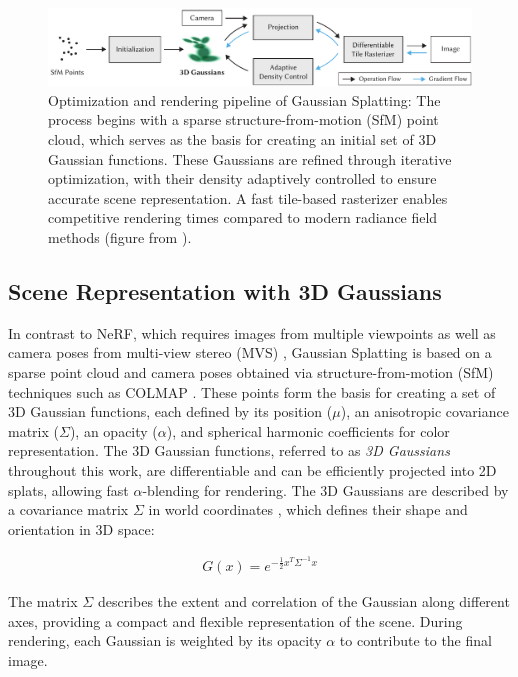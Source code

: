 \begin{figure}
\centering
\includegraphics[width=\linewidth]{Grafiken/Fundamentals/overview_01.pdf}
\caption{Optimization and rendering pipeline of Gaussian Splatting: The process begins with a sparse structure-from-motion (SfM) point cloud, which serves as the basis for creating an initial set of 3D Gaussian functions. These Gaussians are refined through iterative optimization, with their density adaptively controlled to ensure accurate scene representation. A fast tile-based rasterizer enables competitive rendering times compared to modern radiance field methods (figure from \cite{kerbl3Dgaussians}).}
\label{fig:overview}
\end{figure}


\subsection{Scene Representation with 3D Gaussians}

In contrast to NeRF, which requires images from multiple viewpoints as well as camera poses from multi-view stereo (MVS) \cite{schoenberger2016mvs}, Gaussian Splatting is based on a sparse point cloud and camera poses obtained via structure-from-motion (SfM) techniques such as COLMAP \cite{schoenberger2016sfm}.
These points form the basis for creating a set of 3D Gaussian functions, each defined by its position (\(\mu\)), an anisotropic covariance matrix (\(\Sigma\)), an opacity (\(\alpha\)), and spherical harmonic coefficients for color representation.
The 3D Gaussian functions, referred to as \textit{3D Gaussians} throughout this work, are differentiable and can be efficiently projected into 2D splats, allowing fast \(\alpha\)-blending for rendering.
The 3D Gaussians are described by a covariance matrix \(\Sigma\) in world coordinates \cite{kerbl3Dgaussians}, which defines their shape and orientation in 3D space:

\begin{align}
G(x) = e^{-\frac{1}{2} x^T \Sigma^{-1} x}
\end{align}

The matrix \(\Sigma\) describes the extent and correlation of the Gaussian along different axes, providing a compact and flexible representation of the scene.
During rendering, each Gaussian is weighted by its opacity \(\alpha\) to contribute to the final image.


